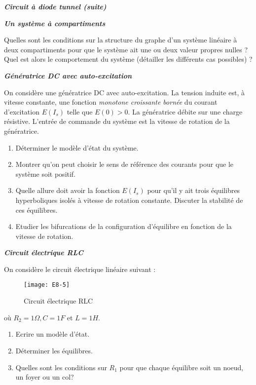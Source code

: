 \begin{exemple}{\bf \em Circuit {à} diode tunnel (suite)}
\begin{exercice} {\bf \em Un système à compartiments}

Quelles sont les conditions sur la structure du graphe d'un
système linéaire à deux compartiments pour que le système ait
une ou deux valeur propres nulles ? Quel est alors le comportement du
système (détailler les différents cas possibles) ?
\end{exercice}
\vv

\begin{exercice}{\bf \em Génératrice DC avec auto-excitation}

On considère une génératrice DC avec auto-excitation. La tension induite est, à vitesse constante, une fonction {\em monotone
croissante bornée} du courant d'excitation $E(I_s)$ telle que $E(0) >
0$. La génératrice débite sur une charge résistive. L'entrée de
commande du système est la vitesse de rotation de la
génératrice.
\begin{enumerate}
\item Déterminer le modèle d'état du système.
\item Montrer qu'on peut choisir le sens de référence des courants pour que le système soit positif.
\item Quelle allure doit avoir la fonction $E(I_s)$ pour qu'il y ait trois
équilibres hyperboliques isolés à vitesse de rotation constante. Discuter la
stabilité de ces équilibres.
\item Etudier les bifurcations de la configuration d'équilibre en fonction de la vitesse de rotation.
\end{enumerate}
\end{exercice}
\vv

\begin{exercice} {\bf \em Circuit électrique RLC} 

On considère le circuit électrique linéaire suivant :
\begin{figure}[h] 
   \centering
   \texttt{[image: E8-5]} 
   \caption{Circuit électrique RLC}
   \label{fig:E8-5}
\end{figure}

où $R_2 = 1\Omega, C = 1F$ et $L = 1H$.

\begin{enumerate}
\item Ecrire un modèle d'état.
\item Déterminer les équilibres.
\item Quelles sont les conditions sur $R_1$ pour que chaque équilibre soit un
noeud, un foyer ou un col?
\end{enumerate}


\end{exercice}
\end{exemple}
